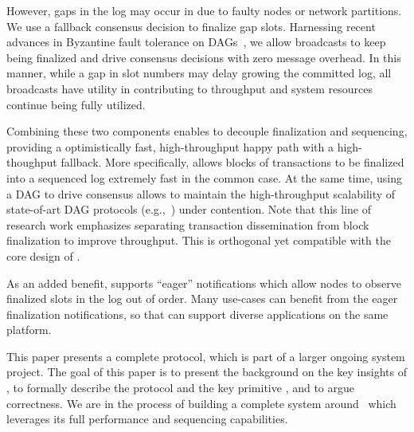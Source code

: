 However, gaps in the log may occur in \system due to faulty nodes or network partitions. 
We use a fallback consensus decision to finalize gap slots. 
Harnessing recent advances in Byzantine fault tolerance on DAGs~\cite{spiegelman2022bullshark,fino},
we allow broadcasts to keep being finalized and drive consensus decisions with zero message overhead.
In this manner, while a gap in slot numbers may delay growing the committed log, 
all broadcasts have utility in contributing to throughput and system resources continue being fully utilized.

Combining these two components enables \system to decouple finalization and sequencing, providing a optimistically fast, high-throughput happy path with a high-thoughput fallback.
More specifically, \primitive allows blocks of transactions to be finalized into a sequenced log extremely fast in the common case. 
At the same time, using a DAG to drive consensus allows \system to maintain the high-throughput scalability of state-of-art DAG protocols (e.g.,~\cite{gkagol2019aleph, danezis2022narwhal, spiegelman2022bullshark}) under contention.
Note that this line of research work emphasizes separating transaction dissemination from block finalization to improve throughput. 
This is orthogonal yet compatible with the core design of \system.

As an added benefit, \system supports ``eager'' notifications which allow nodes to observe finalized slots in the log out of order.
Many use-cases can benefit from the eager finalization notifications, so that \system can support diverse applications on the same platform.

This paper presents a complete \system protocol, which is part of a larger ongoing system project. The goal of this paper is to
present the background on the key insights of \system, to formally describe the protocol and the key primitive \primitive,
and to argue correctness. We are in the process of building a complete system around \system~which
leverages its full performance and sequencing capabilities.